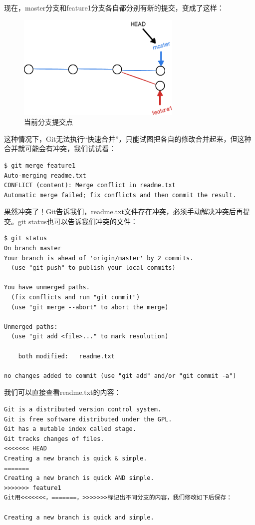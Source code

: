 现在，master分支和feature1分支各自都分别有新的提交，变成了这样：

\begin{figure}[h]
  \centering
  \includegraphics[width=0.7\textwidth]{img/git-br-feature1.png}
  \caption{当前分支提交点}
  \label{fig:git-br-feature1}
\end{figure}

这种情况下，Git无法执行“快速合并”，只能试图把各自的修改合并起来，但这种合并就可能会有冲突，我们试试看：

\begin{verbatim}
$ git merge feature1
Auto-merging readme.txt
CONFLICT (content): Merge conflict in readme.txt
Automatic merge failed; fix conflicts and then commit the result.
\end{verbatim}

果然冲突了！Git告诉我们，readme.txt文件存在冲突，必须手动解决冲突后再提交。git status也可以告诉我们冲突的文件：

\begin{verbatim}
$ git status
On branch master
Your branch is ahead of 'origin/master' by 2 commits.
  (use "git push" to publish your local commits)

You have unmerged paths.
  (fix conflicts and run "git commit")
  (use "git merge --abort" to abort the merge)

Unmerged paths:
  (use "git add <file>..." to mark resolution)

	both modified:   readme.txt

no changes added to commit (use "git add" and/or "git commit -a")
\end{verbatim}

我们可以直接查看readme.txt的内容：

\begin{verbatim}
Git is a distributed version control system.
Git is free software distributed under the GPL.
Git has a mutable index called stage.
Git tracks changes of files.
<<<<<<< HEAD
Creating a new branch is quick & simple.
=======
Creating a new branch is quick AND simple.
>>>>>>> feature1
Git用<<<<<<<，=======，>>>>>>>标记出不同分支的内容，我们修改如下后保存：

Creating a new branch is quick and simple.
\end{verbatim}


